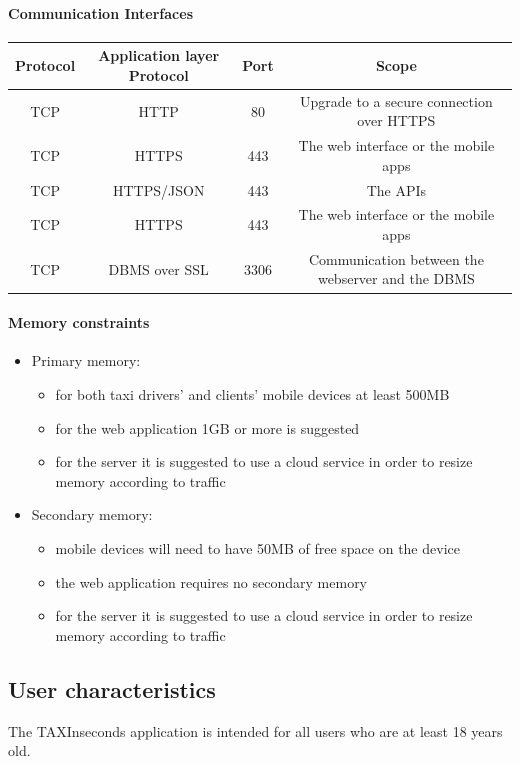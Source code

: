 \documentclass{article}
\begin{document}
\paragraph{Communication Interfaces}
\begin{center}
	\begin{tabular}{*{4}{c}}
		\toprule
		Protocol & Application layer Protocol & Port & Scope \\
		\midrule
		TCP & HTTP & 80 & Upgrade to a secure connection over HTTPS \\ 
		TCP & HTTPS & 443 & The web interface or the mobile apps \\ 
		TCP & HTTPS/JSON & 443 & The APIs \\ 
		TCP & HTTPS & 443 & The web interface or the mobile apps \\ 
		TCP & DBMS over SSL & 3306 & Communication between the webserver and the DBMS \\ 
		\bottomrule
	\end{tabular}
\end{center}
\paragraph{Memory constraints} 
\begin{itemize}
	\item Primary memory:
		\begin{itemize}
			\item for both taxi drivers' and clients' mobile devices at least 500MB 
			\item for the web application 1GB or more is suggested
			\item for the server it is suggested to use a cloud service in order to resize memory according to traffic
		\end{itemize}
	\item Secondary memory:
		\begin{itemize}
			\item mobile devices will need to have 50MB of free space on the device
			\item the web application requires no secondary memory 
			\item for the server it is suggested to use a cloud service in order to resize memory according to traffic
		\end{itemize}
\end{itemize}
\subsection{User characteristics}
The TAXInseconds application is intended for all users who are at least 18 years old. %
\end{document}
